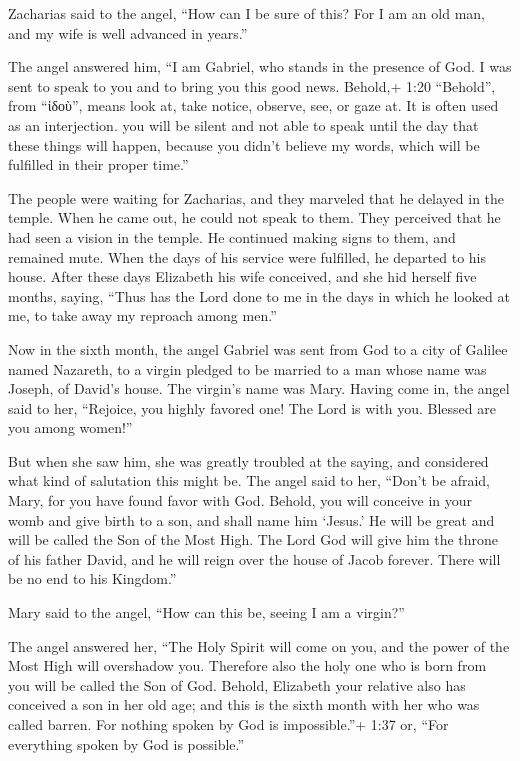  Zacharias said to the angel, ``How can I be sure of this?
For I am an old man, and my wife is well advanced in years.''

 The angel answered him, ``I am Gabriel, who stands in the
presence of God. I was sent to speak to you and to bring you this good
news.  Behold,+ 1:20 ``Behold'', from ``ἰδοὺ'', means look
at, take notice, observe, see, or gaze at. It is often used as an
interjection. you will be silent and not able to speak until the day
that these things will happen, because you didn't believe my words,
which will be fulfilled in their proper time.''

 The people were waiting for Zacharias, and they marveled
that he delayed in the temple.  When he came out, he could
not speak to them. They perceived that he had seen a vision in the
temple. He continued making signs to them, and remained mute.
 When the days of his service were fulfilled, he departed
to his house.  After these days Elizabeth his wife
conceived, and she hid herself five months, saying,  ``Thus
has the Lord done to me in the days in which he looked at me, to take
away my reproach among men.''

 Now in the sixth month, the angel Gabriel was sent from
God to a city of Galilee named Nazareth,  to a virgin
pledged to be married to a man whose name was Joseph, of David's house.
The virgin's name was Mary.  Having come in, the angel said
to her, ``Rejoice, you highly favored one! The Lord is with you. Blessed
are you among women!''

 But when she saw him, she was greatly troubled at the
saying, and considered what kind of salutation this might be.
 The angel said to her, ``Don't be afraid, Mary, for you
have found favor with God.  Behold, you will conceive in
your womb and give birth to a son, and shall name him `Jesus.'
 He will be great and will be called the Son of the Most
High. The Lord God will give him the throne of his father David,
 and he will reign over the house of Jacob forever. There
will be no end to his Kingdom.''

 Mary said to the angel, ``How can this be, seeing I am a
virgin?''

 The angel answered her, ``The Holy Spirit will come on
you, and the power of the Most High will overshadow you. Therefore also
the holy one who is born from you will be called the Son of God.
 Behold, Elizabeth your relative also has conceived a son
in her old age; and this is the sixth month with her who was called
barren.  For nothing spoken by God is impossible.''+ 1:37
or, ``For everything spoken by God is possible.''

